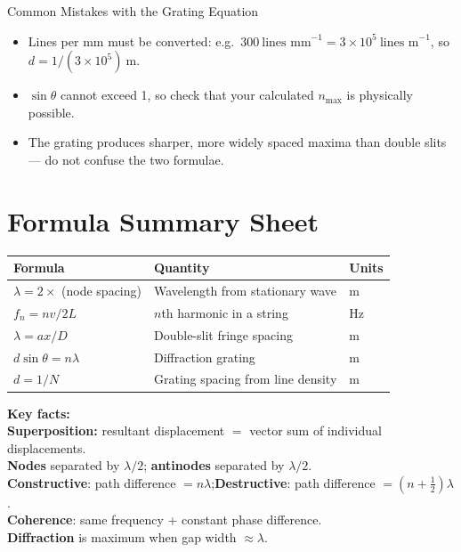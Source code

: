 \begin{warningbox}{Common Mistakes with the Grating Equation}
\begin{itemize}[itemsep=2pt]
  \item Lines per mm must be converted: e.g.\ $300\ \text{lines mm}^{-1} = 3\times10^5\ \text{lines m}^{-1}$, so $d = 1/(3\times10^5)\ \text{m}$.
  \item $\sin\theta$ cannot exceed 1, so check that your calculated $n_{\max}$ is physically possible.
  \item The grating produces sharper, more widely spaced maxima than double slits — do not confuse the two formulae.
\end{itemize}
\end{warningbox}

\section{Formula Summary Sheet}

\begin{minipage}{\linewidth}
\begin{tcolorbox}[colback=lightgold, colframe=accentgold]
\renewcommand{\arraystretch}{1.8}
\begin{tabular}{@{}lll@{}}
\toprule
\textbf{Formula} & \textbf{Quantity} & \textbf{Units} \\
\midrule
$\lambda = 2 \times$ (node spacing) & Wavelength from stationary wave & m \\
$f_n = nv/2L$ & $n$th harmonic in a string & Hz \\
$\lambda = ax/D$ & Double-slit fringe spacing & m \\
$d\sin\theta = n\lambda$ & Diffraction grating & m \\
$d = 1/N$ & Grating spacing from line density & m \\
\bottomrule
\end{tabular}
\end{tcolorbox}

\vspace{0.5em}
\begin{tcolorbox}[colback=lightblue, colframe=darkblue]
\textbf{Key facts:}\\[0.3em]
\textbf{Superposition:} resultant displacement $=$ vector sum of individual displacements.\\[0.2em]
\textbf{Nodes} separated by $\lambda/2$; \textbf{antinodes} separated by $\lambda/2$.\\[0.2em]
\textbf{Constructive}: path difference $= n\lambda$;\quad \textbf{Destructive}: path difference $= (n+\tfrac{1}{2})\lambda$.\\[0.2em]
\textbf{Coherence}: same frequency + constant phase difference.\\[0.2em]
\textbf{Diffraction} is maximum when gap width $\approx \lambda$.
\end{tcolorbox}
\end{minipage}


